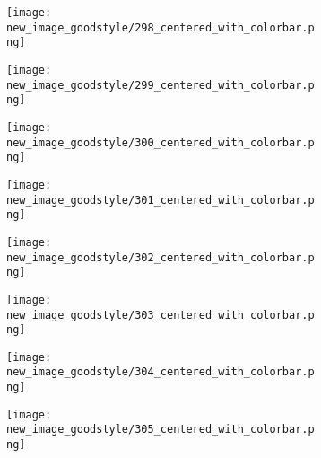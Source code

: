 \documentclass[a4paper,12pt]{article}
\begin{document}
\begin{figure}[H]
  \begin{subfigure}{0.11\textwidth}
    \texttt{[image: new\_image\_goodstyle/298\_centered\_with\_colorbar.png]}
  \end{subfigure}
  \hfill
  \begin{subfigure}{0.11\textwidth}
    \texttt{[image: new\_image\_goodstyle/299\_centered\_with\_colorbar.png]}
  \end{subfigure}
  \hfill
  \begin{subfigure}{0.11\textwidth}
    \texttt{[image: new\_image\_goodstyle/300\_centered\_with\_colorbar.png]}
  \end{subfigure}
  \hfill
  \begin{subfigure}{0.11\textwidth}
    \texttt{[image: new\_image\_goodstyle/301\_centered\_with\_colorbar.png]}
  \end{subfigure}
  \hfill
  \begin{subfigure}{0.11\textwidth}
    \texttt{[image: new\_image\_goodstyle/302\_centered\_with\_colorbar.png]}
  \end{subfigure}
  \hfill
  \begin{subfigure}{0.11\textwidth}
    \texttt{[image: new\_image\_goodstyle/303\_centered\_with\_colorbar.png]}
  \end{subfigure}
  \hfill
  \begin{subfigure}{0.11\textwidth}
    \texttt{[image: new\_image\_goodstyle/304\_centered\_with\_colorbar.png]}
  \end{subfigure}
  \hfill
  \begin{subfigure}{0.11\textwidth}
    \texttt{[image: new\_image\_goodstyle/305\_centered\_with\_colorbar.png]}
  \end{subfigure}
  \hfill
\end{figure}
\end{document}
